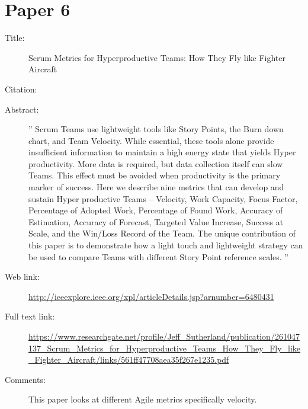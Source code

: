 \documentclass{scrartcl}
\begin{document}
\section*{Paper 6}
\begin{description}
	\item[Title:] Scrum Metrics for Hyperproductive Teams: How They Fly like Fighter Aircraft 
	\item[Citation:] \cite{Downey}
	\item[Abstract:] '' Scrum Teams use lightweight tools like Story Points, the Burn down chart, and Team Velocity. While essential, these tools alone provide insufficient information to maintain a high energy state that yields Hyper productivity. More data is required, but data collection itself can slow Teams. This effect must be avoided when productivity is the primary marker of success. Here we describe nine metrics that can develop and sustain Hyper productive Teams -- Velocity, Work Capacity, Focus Factor, Percentage of Adopted Work, Percentage of Found Work, Accuracy of Estimation, Accuracy of Forecast, Targeted Value Increase, Success at Scale, and the Win/Loss Record of the Team. The unique contribution of this paper is to demonstrate how a light touch and lightweight strategy can be used to compare Teams with different Story Point reference scales. ''
	\item[Web link:] \url{http://ieeexplore.ieee.org/xpl/articleDetails.jsp?arnumber=6480431}
	\item[Full text link:] \url{https://www.researchgate.net/profile/Jeff_Sutherland/publication/261047137_Scrum_Metrics_for_Hyperproductive_Teams_How_They_Fly_like_Fighter_Aircraft/links/561ff47708aea35f267e1235.pdf}
	\item[Comments:] This paper looks at different Agile metrics specifically velocity. 
\end{description}




\end{document}
